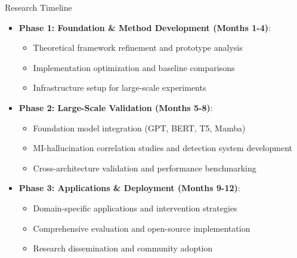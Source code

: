 \documentclass[aspectratio=169]{beamer}
\begin{document}
\begin{frame}{Research Timeline}
\begin{itemize}
    \item \textbf{Phase 1: Foundation \& Method Development (Months 1-4)}:
    \begin{itemize}
        \item Theoretical framework refinement and prototype analysis
        \item Implementation optimization and baseline comparisons
        \item Infrastructure setup for large-scale experiments
    \end{itemize}
    \item \textbf{Phase 2: Large-Scale Validation (Months 5-8)}:
    \begin{itemize}
        \item Foundation model integration (GPT, BERT, T5, Mamba)
        \item MI-hallucination correlation studies and detection system development
        \item Cross-architecture validation and performance benchmarking
    \end{itemize}
    \item \textbf{Phase 3: Applications \& Deployment (Months 9-12)}:
    \begin{itemize}
        \item Domain-specific applications and intervention strategies
        \item Comprehensive evaluation and open-source implementation
        \item Research dissemination and community adoption
    \end{itemize}
\end{itemize}
\end{frame}
\end{document}
